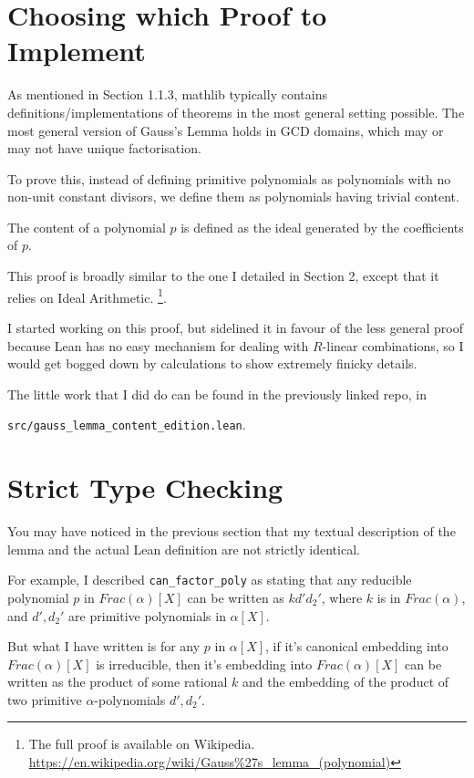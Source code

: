 \documentclass[pagesize=a4]{scrreprt}
\begin{document}
\section{Choosing which Proof to Implement}

As mentioned in Section 1.1.3, mathlib typically contains definitions/implementations of theorems in the most general setting possible. The most general version of Gauss's Lemma holds in GCD domains, which may or may not have unique factorisation. 

To prove this, instead of defining primitive polynomials as polynomials with no non-unit constant divisors, we define them as polynomials having trivial content. 

The content of a polynomial $p$ is defined as the ideal generated by the coefficients of $p$. 

This proof is broadly similar to the one I detailed in Section 2, except that it relies on Ideal Arithmetic. \footnote{The full proof is available on Wikipedia. \url{https://en.wikipedia.org/wiki/Gauss\%27s\_lemma\_(polynomial)}}. 

I started working on this proof, but sidelined it in favour of the less general proof because Lean has no easy mechanism for dealing with $R$-linear combinations, so I would get bogged down by calculations to show extremely finicky details. 

The little work that I did do can be found in the previously linked repo, in 

\texttt{src/gauss\_lemma\_content\_edition.lean}. 


\section{Strict Type Checking}

You may have noticed in the previous section that my textual description of the lemma and the actual Lean definition are not strictly identical. 

For example, I described \texttt{can\_factor\_poly} as stating that any reducible polynomial $p$ in $Frac(\alpha)[X]$ can be written as $kd'd_2'$, where $k$ is in $Frac(\alpha)$, and $d', d_2'$ are primitive polynomials in $ \alpha[X]$. 

But what I have written is for any $p$ in $\alpha[X]$, if it's canonical embedding into $Frac(\alpha)[X]$ is irreducible, then it's embedding into $Frac(\alpha)[X]$ can be written as the product of some rational $k$ and the embedding of the product of two primitive $\alpha$-polynomials $d',d_2'$. 
\end{document}
